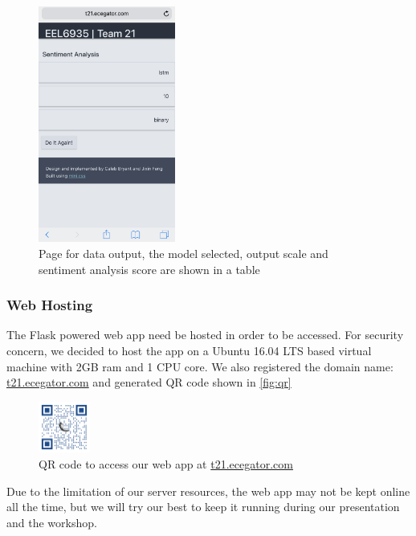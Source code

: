 \documentclass[conference]{IEEEtran}
\begin{document}
    \begin{figure}
        \center\includegraphics[width=0.4\textwidth]{figure/flask_output}
        \caption{Page for data output, the model selected, output scale and
        sentiment analysis score are shown in a table}
        \label{fig:flask_out}
    \end{figure}

\subsubsection{Web Hosting}
\label{model:front:host}
    The Flask powered web app need be hosted in order to be accessed. For security concern,
    we decided to host the app on a Ubuntu 16.04 LTS based virtual machine with 2GB ram and
    1 CPU core. We also registered the domain name: \url{t21.ecegator.com} and generated
    QR code shown in \autoref{fig:qr}
    \begin{figure}
        \center\includegraphics[width=0.15\textwidth]{figure/qr_website}
        \caption{QR code to access our web app at \url{t21.ecegator.com}}
        \label{fig:qr}
    \end{figure}
    Due to the limitation of our server resources, the web app may not be kept online
    all the time, but we will try our best to keep it running during our presentation
    and the workshop.
\end{document}
